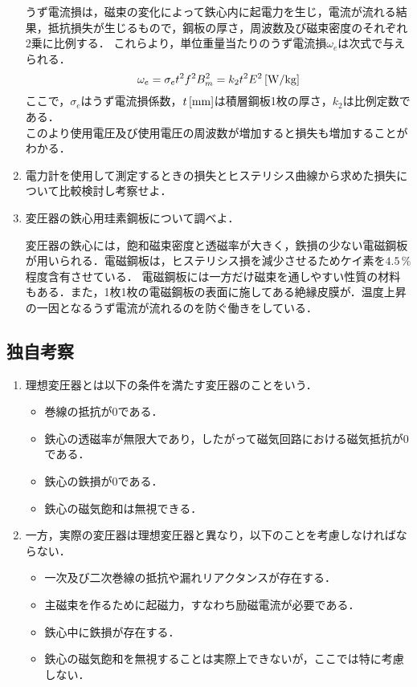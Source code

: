 \begin{enumerate}[1.]
	うず電流損は，磁束の変化によって鉄心内に起電力を生じ，電流が流れる結果，抵抗損失が生じるもので，鋼板の厚さ，周波数及び磁束密度のそれぞれ2乗に比例する．
	これらより，単位重量当たりのうず電流損$\omega_{e}$は次式で与えられる．
	\begin{equation}
	\omega_{e}=\sigma_{e}t^{2}f^{2}B_{m}^{2}=k_{2}t^{2}E^{2}\,[\rm{W/kg}]
	\label{eq:uzue}
	\end{equation}
	ここで，$\sigma_{e}$はうず電流損係数，$t\,[\rm{mm}]$は積層鋼板1枚の厚さ，$k_{2}$は比例定数である．\\
	このより使用電圧及び使用電圧の周波数が増加すると損失も増加することがわかる．
	\item 電力計を使用して測定するときの損失とヒステリシス曲線から求めた損失について比較検討し考察せよ．
	
	\item 変圧器の鉄心用珪素鋼板について調べよ．\cite{1130282270091060}
	
	変圧器の鉄心には，飽和磁束密度と透磁率が大きく，鉄損の少ない電磁鋼板が用いられる．電磁鋼板は，ヒステリシス損を減少させるためケイ素を$4.5\,\%$程度含有させている．
	電磁鋼板には一方だけ磁束を通しやすい性質の材料もある．また，1枚1枚の電磁鋼板の表面に施してある絶縁皮膜が．温度上昇の一因となるうず電流が流れるのを防ぐ働きをしている．
\end{enumerate}

\subsection{独自考察}
\begin{enumerate}[1.]
	\item 理想変圧器とは以下の条件を満たす変圧器のことをいう\cite{1130000795154912128}．
\begin{itemize}
	\item 巻線の抵抗が0である．
	\item 鉄心の透磁率が無限大であり，したがって磁気回路における磁気抵抗が0である．
	\item 鉄心の鉄損が0である．
	\item 鉄心の磁気飽和は無視できる．
\end{itemize}
\item 一方，実際の変圧器は理想変圧器と異なり，以下のことを考慮しなければならない\cite{1130154912128}．
\begin{itemize}
	\item 一次及び二次巻線の抵抗や漏れリアクタンスが存在する．
	\item 主磁束を作るために起磁力，すなわち励磁電流が必要である．
	\item 鉄心中に鉄損が存在する．
	\item 鉄心の磁気飽和を無視することは実際上できないが，ここでは特に考慮しない．
\end{itemize}
\end{enumerate}